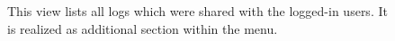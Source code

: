 \documentclass[../main.tex]{subfiles}
\begin{document}
\begin{figure}[h!]
    \centering
    \caption[Clotilde Ui: Shared logs]{
        This view lists all logs which were shared with the logged-in users.
        It is realized as additional section within the menu.
    }
    \label{app:clotilde-shared}
\end{figure}
\end{document}
